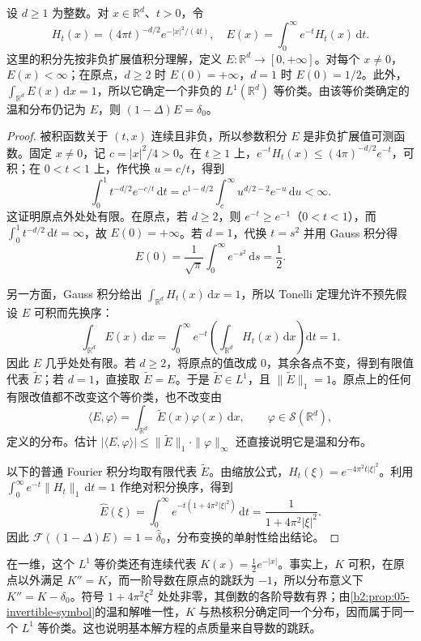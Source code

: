 \begin{proposition}\label{b2:prop:05-bessel-fundamental}
设 \(d\geq1\) 为整数。对 \(x\in\mathbb R^d\)、\(t>0\)，令
\[
 H_t(x)=(4\pi t)^{-d/2}e^{-|x|^2/(4t)},\quad
 E(x)=\int_0^\infty e^{-t}H_t(x)\,\mathrm{d}t.
\]
这里的积分先按非负扩展值积分理解，定义 \(E:\mathbb R^d\to[0,+\infty]\)。对每个 \(x\ne0\)，\(E(x)<\infty\)；在原点，\(d\geq2\) 时 \(E(0)=+\infty\)，\(d=1\) 时 \(E(0)=1/2\)。此外，\(\int_{\mathbb R^d}E(x)\,\mathrm{d}x=1\)，所以它确定一个非负的 \(L^1(\mathbb R^d)\) 等价类。由该等价类确定的温和分布仍记为 \(E\)，则 \((1-\Delta)E=\delta_0\)。
\end{proposition}
\begin{proof}
被积函数关于 \((t,x)\) 连续且非负，所以参数积分 \(E\) 是非负扩展值可测函数。固定 \(x\ne0\)，记 \(c=|x|^2/4>0\)。在 \(t\geq1\) 上，\(e^{-t}H_t(x)\leq(4\pi)^{-d/2}e^{-t}\)，可积；在 \(0<t<1\) 上，作代换 \(u=c/t\)，得到
\[
 \int_0^1t^{-d/2}e^{-c/t}\,\mathrm{d}t
 =c^{1-d/2}\int_c^\infty u^{d/2-2}e^{-u}\,\mathrm{d}u<\infty.
\]
这证明原点外处处有限。在原点，若 \(d\geq2\)，则 \(e^{-t}\geq e^{-1}\)（\(0<t<1\)），而 \(\int_0^1t^{-d/2}\,\mathrm{d}t=\infty\)，故 \(E(0)=+\infty\)。若 \(d=1\)，代换 \(t=s^2\) 并用 Gauss 积分得
\[
 E(0)=\frac1{\sqrt\pi}\int_0^\infty e^{-s^2}\,\mathrm{d}s=\frac12.
\]

另一方面，Gauss 积分给出 \(\int_{\mathbb R^d}H_t(x)\,\mathrm{d}x=1\)，所以 Tonelli 定理允许不预先假设 \(E\) 可积而先换序：
\[
 \int_{\mathbb R^d}E(x)\,\mathrm{d}x
 =\int_0^\infty e^{-t}\left(\int_{\mathbb R^d}H_t(x)\,\mathrm{d}x\right)\mathrm{d}t=1.
\]
因此 \(E\) 几乎处处有限。若 \(d\geq2\)，将原点的值改成 \(0\)，其余各点不变，得到有限值代表 \(\widetilde E\)；若 \(d=1\)，直接取 \(\widetilde E=E\)。于是 \(\widetilde E\in L^1\)，且 \(\|\widetilde E\|_1=1\)。原点上的任何有限改值都不改变这个等价类，也不改变由
\[
 \langle E,\varphi\rangle=\int_{\mathbb R^d}\widetilde E(x)\varphi(x)\,\mathrm{d}x,
 \qquad\varphi\in\mathcal S(\mathbb R^d),
\]
定义的分布。估计 \(|\langle E,\varphi\rangle|\leq\|\widetilde E\|_1\cdot\|\varphi\|_\infty\) 还直接说明它是温和分布。

以下的普通 Fourier 积分均取有限代表 \(\widetilde E\)。由缩放公式，\(\widehat H_t(\xi)=e^{-4\pi^2t|\xi|^2}\)。利用 \(\int_0^\infty e^{-t}\|H_t\|_1\,\mathrm{d}t=1\) 作绝对积分换序，得到
\[
 \widehat E(\xi)=\int_0^\infty e^{-t(1+4\pi^2|\xi|^2)}\,\mathrm{d}t
 =\dfrac1{1+4\pi^2|\xi|^2}.
\]
因此 \(\mathcal F((1-\Delta)E)=1=\widehat\delta_0\)，分布变换的单射性给出结论。
\end{proof}

在一维，这个 \(L^1\) 等价类还有连续代表 \(K(x)=\tfrac12e^{-|x|}\)。事实上，\(K\) 可积，在原点以外满足 \(K''=K\)，而一阶导数在原点的跳跃为 \(-1\)，所以分布意义下 \(K''=K-\delta_0\)。符号 \(1+4\pi^2\xi^2\) 处处非零，其倒数的各阶导数有界；由\cref{b2:prop:05-invertible-symbol}的温和解唯一性，\(K\) 与热核积分确定同一个分布，因而属于同一个 \(L^1\) 等价类。这也说明基本解方程的点质量来自导数的跳跃。

